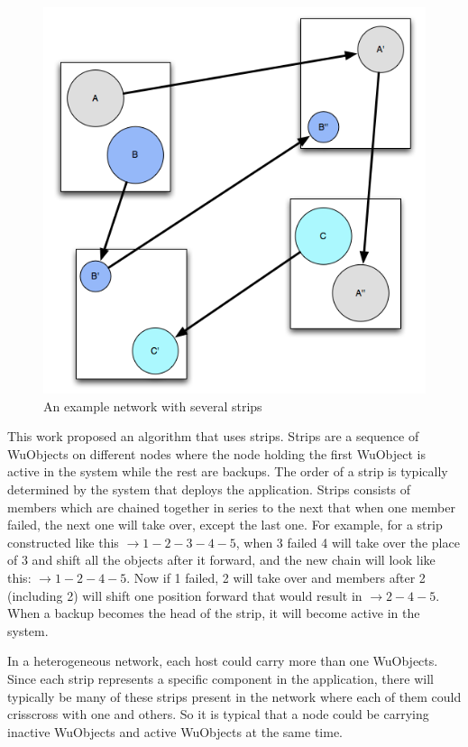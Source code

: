 \begin{figure}[h!]
\caption{An example network with several strips}
\label{fig:strips-network}
\centering
    \includegraphics[width=\linewidth]{figures/strips-network}
\end{figure}

This work proposed an algorithm that uses strips. Strips are a sequence of
WuObjects on different nodes where the node holding the first WuObject is
active in the system while the rest are backups. The order of a strip is
typically determined by the system that deploys the application. Strips
consists of members which are chained together in series to the next that when
one member failed, the next one will take over, except the last one. For
example, for a strip constructed like this $\rightarrow 1-2-3-4-5$, when
3 failed 4 will take over the place of 3 and shift all the objects after it
forward, and the new chain will look like this: $\rightarrow 1-2-4-5$. Now if
1 failed, 2 will take over and members after 2 (including 2) will shift one
position forward that would result in $\rightarrow 2-4-5$. When a backup
becomes the head of the strip, it will become active in the system.

In a heterogeneous network, each host could carry more than one WuObjects.
Since each strip represents a specific component in the application, there will
typically be many of these strips present in the network where each of them
could crisscross with one and others. So it is typical that a node could be
carrying inactive WuObjects and active WuObjects at the same time.

